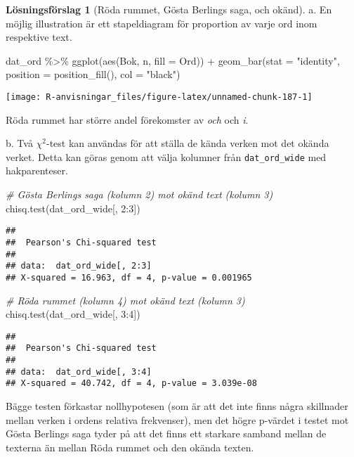 \documentclass[
]{book}
\newenvironment{Shaded}{\begin{snugshade}}{\end{snugshade}}
\newcommand{\AttributeTok}[1]{\textcolor[rgb]{0.77,0.63,0.00}{#1}}
\newcommand{\CommentTok}[1]{\textcolor[rgb]{0.56,0.35,0.01}{\textit{#1}}}
\newcommand{\DecValTok}[1]{\textcolor[rgb]{0.00,0.00,0.81}{#1}}
\newcommand{\FunctionTok}[1]{\textcolor[rgb]{0.00,0.00,0.00}{#1}}
\newcommand{\NormalTok}[1]{#1}
\newcommand{\SpecialCharTok}[1]{\textcolor[rgb]{0.00,0.00,0.00}{#1}}
\newcommand{\StringTok}[1]{\textcolor[rgb]{0.31,0.60,0.02}{#1}}
\theoremstyle{definition}
\theoremstyle{definition}
\theoremstyle{definition}
\theoremstyle{definition}
\newtheorem{hypothesis}{Lösningsförslag}[chapter]
\theoremstyle{remark}
\begin{document}
\begin{hypothesis}[Röda rummet, Gösta Berlings saga, och okänd]
a. En möjlig illustration är ett stapeldiagram för proportion av varje ord inom respektive text.

\begin{Shaded}
\begin{Highlighting}[]
\NormalTok{dat\_ord }\SpecialCharTok{\%\textgreater{}\%}
  \FunctionTok{ggplot}\NormalTok{(}\FunctionTok{aes}\NormalTok{(Bok, n, }\AttributeTok{fill =}\NormalTok{ Ord)) }\SpecialCharTok{+}
  \FunctionTok{geom\_bar}\NormalTok{(}\AttributeTok{stat =} \StringTok{"identity"}\NormalTok{, }\AttributeTok{position =} \FunctionTok{position\_fill}\NormalTok{(), }\AttributeTok{col =} \StringTok{"black"}\NormalTok{)}
\end{Highlighting}
\end{Shaded}

\begin{center}\texttt{[image: R-anvisningar\_files/figure-latex/unnamed-chunk-187-1]} \end{center}

Röda rummet har större andel förekomster av \emph{och} och \emph{i}.

b. Två \(\chi^2\)-test kan användas för att ställa de kända verken mot det okända verket. Detta kan göras genom att välja kolumner från \texttt{dat\_ord\_wide} med hakparenteser.

\begin{Shaded}
\begin{Highlighting}[]
\CommentTok{\# Gösta Berlings saga (kolumn 2) mot okänd text (kolumn 3)}
\FunctionTok{chisq.test}\NormalTok{(dat\_ord\_wide[, }\DecValTok{2}\SpecialCharTok{:}\DecValTok{3}\NormalTok{])}
\end{Highlighting}
\end{Shaded}

\begin{verbatim}
## 
##  Pearson's Chi-squared test
## 
## data:  dat_ord_wide[, 2:3]
## X-squared = 16.963, df = 4, p-value = 0.001965
\end{verbatim}

\begin{Shaded}
\begin{Highlighting}[]
\CommentTok{\# Röda rummet (kolumn 4) mot okänd text (kolumn 3)}
\FunctionTok{chisq.test}\NormalTok{(dat\_ord\_wide[, }\DecValTok{3}\SpecialCharTok{:}\DecValTok{4}\NormalTok{])}
\end{Highlighting}
\end{Shaded}

\begin{verbatim}
## 
##  Pearson's Chi-squared test
## 
## data:  dat_ord_wide[, 3:4]
## X-squared = 40.742, df = 4, p-value = 3.039e-08
\end{verbatim}

Bägge testen förkastar nollhypotesen (som är att det inte finns några skillnader mellan verken i ordens relativa frekvenser), men det högre p-värdet i testet mot Gösta Berlings saga tyder på att det finns ett starkare samband mellan de texterna än mellan Röda rummet och den okända texten.
\end{hypothesis}
\end{document}
